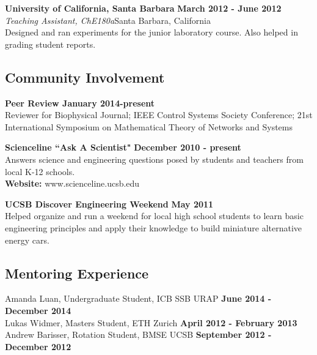 {{\bf University of California, Santa Barbara} \hfill {\bf March 2012 - June 2012}\\
{\em Teaching Assistant, ChE180a}\hfill  Santa Barbara, California\\
Designed and ran experiments for the junior laboratory course. Also helped in grading student reports.

\subsection*{Community Involvement}
{\bf Peer Review \hfill January 2014-present}\\
Reviewer for Biophysical Journal;  IEEE Control Systems Society Conference; 21st International Symposium on
Mathematical Theory of Networks and Systems

{\bf Scienceline ``Ask A Scientist"} \hfill {\bf December 2010 - present}\\
Answers science and engineering questions posed by students and teachers from local K-12 schools. \\
{\bfseries Website:} www.scienceline.ucsb.edu

{\bf UCSB Discover Engineering Weekend} \hfill {\bf May 2011}\\
Helped organize and run a weekend for local high school students to learn basic engineering principles and apply their knowledge to build miniature alternative energy cars.


\subsection*{Mentoring Experience}
Amanda Luan, Undergraduate Student, ICB SSB URAP \hfill {\bf June 2014 - December 2014} \\
Lukas Widmer, Masters Student, ETH Zurich \hfill {\bf April 2012 - February 2013} \\
Andrew Barisser, Rotation Student, BMSE UCSB \hfill {\bf September 2012 - December 2012}

}
